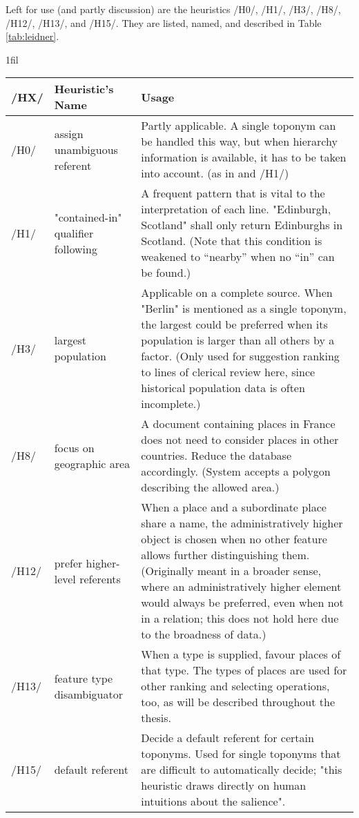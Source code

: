 \documentclass[11pt]{article}
\makeatletter
\newcommand*{\centerfloat}{
  \parindent \z@
  \leftskip \z@ \@plus 1fil \@minus \textwidth
  \rightskip\leftskip
  \parfillskip \z@skip}
\makeatother
\begin{document}
Left for use (and partly discussion) are the heuristics /H0/, /H1/, /H3/, /H8/, /H12/, /H13/, and /H15/. They are listed, named, and described in Table \ref{tab:leidner}.\\

\begin{table*}
  \centerfloat
  \begin{tabular}{l|l|p{8cm}}
   /HX/ & Heuristic's Name & Usage \\
    \hline
    \hline
  /H0/ & assign unambiguous referent & Partly applicable. A single toponym can be handled this way, but when hierarchy information is available, it has to be taken into account. (as in \cite{volz07} and /H1/)\\
    \hline
  /H1/ & "contained-in" qualifier following & A frequent pattern that is vital to the interpretation of each line. "Edinburgh, Scotland" shall only return Edinburghs in Scotland. (Note that this condition is weakened to ``nearby'' when no ``in'' can be found.)\\
    \hline
  /H3/ & largest population & Applicable on a complete source. When "Berlin" is mentioned as a single toponym, the largest could be preferred when its population is larger than all others by a factor. (Only used for suggestion ranking to lines of clerical review here, since historical population data is often incomplete.)\\
    \hline
  /H8/ & focus on geographic area & A document containing places in France does not need to consider places in other countries. Reduce the database accordingly. (System accepts a polygon describing the allowed area.)\\
    \hline
  /H12/ & prefer higher-level referents & When a place and a subordinate place share a name, the administratively higher object is chosen when no other feature allows further distinguishing them. (Originally meant in a broader sense, where an administratively higher element would always be preferred, even when not in a relation; this does not hold here due to the broadness of data.)\\
    \hline
  /H13/ & feature type disambiguator & When a type is supplied, favour places of that type. The types of places are used for other ranking and selecting operations, too, as will be described throughout the thesis.\\
    \hline
  /H15/ & default referent & Decide a default referent for certain toponyms. Used for single toponyms that are difficult to automatically decide; "this heuristic draws directly on human intuitions about the salience". \cite[p. 108]{leidner07}\\
  \end{tabular}
  \caption{Applied heuristics from Leidner's taxonomy}
  \label{tab:leidner}
\end{table*}
\end{document}
